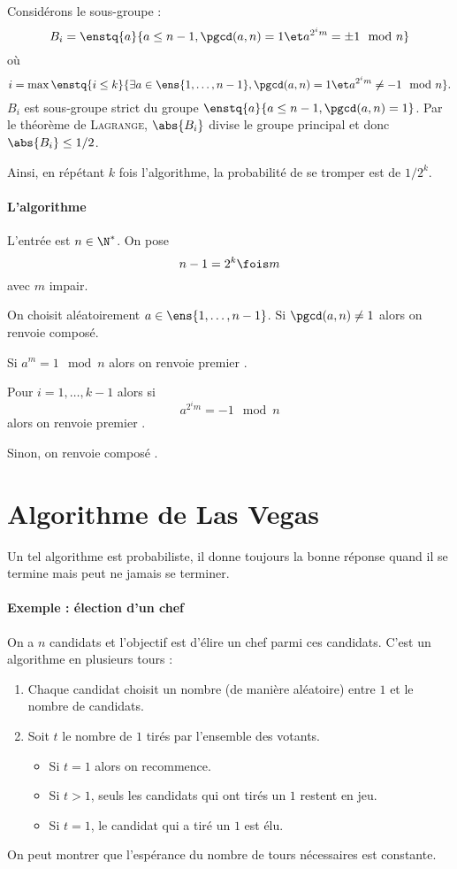 \documentclass{mybourbaki}
\begin{document}
Considérons le sous-groupe : \[ B_i = \enstq{a}{a\leq n-1, \pgcd(a,n) =1 \et a^{2^{i}m}= \pm 1 \mod n} \]où \[ i = \max \enstq{i\leq k}{\exists a \in \ens{1,\ldots,n-1}, \pgcd(a,n) = 1 \et a^{2^{i}m}\neq -1\mod n}.\]$B_i$ est sous-groupe strict du groupe $\enstq{a}{a\leq n-1,\pgcd(a,n) = 1}$. Par le théorème de \textsc{Lagrange}, $\abs{B_i}$ divise le groupe principal et donc $\abs{B_i}\leq 1/2$.

Ainsi, en répétant $k$ fois l'algorithme, la probabilité de se tromper est de $1/2^{k}$.

\paragraph{L'algorithme}L'entrée est $n\in \N^{*}$. On pose $$n-1 = 2^{k}\fois m$$avec $m$ impair.

On choisit aléatoirement $a\in\ens{1,\ldots,n-1}$. Si $\pgcd(a,n)\neq 1$ alors on renvoie \og composé\fg{}.

Si $a^{m} =1 \mod n$ alors on renvoie \og premier \fg{}.

Pour $i = 1,\ldots, k-1$ alors si $$a^{2^{i}m} =-1\mod n$$ alors on renvoie \og premier \fg{}.

Sinon, on renvoie \og composé \fg{}.

\section{Algorithme de Las Vegas}
Un tel algorithme est probabiliste, il donne toujours la bonne réponse quand il se termine mais peut ne jamais se terminer.

\paragraph{Exemple : élection d'un chef}On a $n$ candidats et l'objectif est d'élire un chef parmi ces candidats. C'est un algorithme en plusieurs tours :
\begin{enumerate}
\item Chaque candidat choisit un nombre (de manière aléatoire) entre $1$ et le nombre de candidats.
\item Soit $t$ le nombre de $1$ tirés par l'ensemble des votants. 
\begin{itemize}
\item Si $t =1$ alors on recommence.
\item Si $t>1$, seuls les candidats qui ont tirés un $1$ restent en jeu.
\item Si $t=1$, le candidat qui a tiré un $1$ est élu.
\end{itemize}
\end{enumerate}

On peut montrer que l'espérance du nombre de tours nécessaires est constante.
\end{document}
